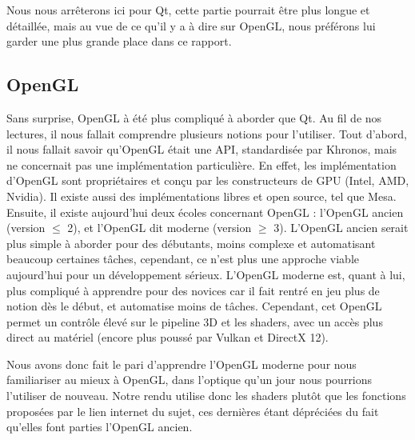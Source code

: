 \documentclass[11pt]{article}
\begin{document}
Nous nous arrêterons ici pour Qt, cette partie pourrait être plus longue et
détaillée, mais au vue de ce qu'il y a à dire sur OpenGL, nous préférons lui
garder une plus grande place dans ce rapport.

\subsection{OpenGL}

Sans surprise, OpenGL à été plus compliqué à aborder que Qt. Au fil de nos
lectures, il nous fallait comprendre plusieurs notions pour l'utiliser. Tout
d'abord, il nous fallait savoir qu'OpenGL était une API, standardisée par
Khronos, mais ne concernait pas une implémentation particulière. En effet, les
implémentation d'OpenGL sont propriétaires et conçu par les constructeurs de GPU
(Intel, AMD, Nvidia). Il existe aussi des implémentations libres et open source,
tel que Mesa. Ensuite, il existe aujourd'hui deux écoles concernant OpenGL :
l'OpenGL ancien (version $\leq$ 2), et l'OpenGL dit moderne (version $\geq$ 3).
L'OpenGL ancien serait plus simple à aborder pour des débutants, moins complexe
et automatisant beaucoup certaines tâches, cependant, ce n'est plus une approche
viable aujourd'hui pour un développement sérieux. L'OpenGL moderne est, quant à
lui, plus compliqué à apprendre pour des novices car il fait rentré en jeu plus
de notion dès le début, et automatise moins de tâches. Cependant, cet OpenGL
permet un contrôle élevé sur le pipeline 3D et les shaders, avec un accès plus
direct au matériel (encore plus poussé par Vulkan et DirectX 12).

Nous avons donc fait le pari d'apprendre l'OpenGL moderne pour nous familiariser
au mieux à OpenGL, dans l'optique qu'un jour nous pourrions l'utiliser de
nouveau. Notre rendu utilise donc les shaders plutôt que les fonctions proposées
par le lien internet du sujet, ces dernières étant dépréciées du fait qu'elles
font parties l'OpenGL ancien. 
\end{document}
